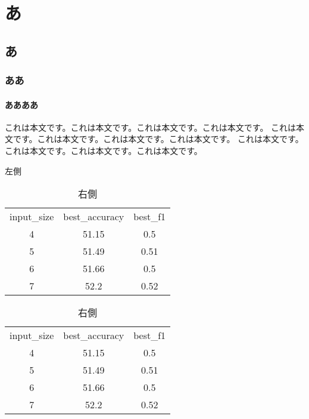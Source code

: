 \documentclass[a4paper,11pt]{ltjsarticle}
\begin{document}
\section{あ}
\subsection{あ}
\subsubsection{ああ}
\paragraph{ああああ}
これは本文です。これは本文です。これは本文です。これは本文です。
これは本文です。これは本文です。これは本文です。これは本文です。
これは本文です。これは本文です。これは本文です。これは本文です。
\begin{table}[h]
  \centering
  \begin{minipage}{0.45\textwidth}
    \centering
    \caption{左側}
    \begin{tabular}{ccc}
      input\_size & best\_accuracy & best\_f1 \\
      4           & 51.15          & 0.5      \\
      5           & 51.49          & 0.51     \\
      6           & 51.66          & 0.5      \\
      7           & 52.2           & 0.52     \\
    \end{tabular}
  \end{minipage}
  \begin{minipage}{0.45\textwidth}
    \centering
    \caption{右側}
    \begin{tabular}{ccc}
      input\_size & best\_accuracy & best\_f1 \\
      4           & 51.15          & 0.5      \\
      5           & 51.49          & 0.51     \\
      6           & 51.66          & 0.5      \\
      7           & 52.2           & 0.52     \\
    \end{tabular}
  \end{minipage}
\end{table}
\end{document}
